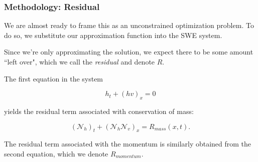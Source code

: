 \begin{frame}
    \frametitle{Methodology: Residual}

    We are almost ready to frame this as an unconstrained optimization problem. To do so, we substitute our approximation 
    function into the SWE system. 

    \bigskip
    \pause

    Since we're only approximating the solution, we expect there to be some amount ``left over", which we call the 
    \textit{residual} and denote $R$. 
    
    \bigskip
    \pause

    The first equation in the system 
    
    $$
    h_t + (hv)_x = 0
    $$
    
    yields the residual term associated with conservation of mass:

    $$
    \left( \mathcal{N}_h \right)_t + \left( \mathcal{N}_h \mathcal{N}_v \right)_x = R_{mass}(x, t).
    $$

    \bigskip
    \pause

    The residual term associated with the momentum is similarly obtained from the second equation, which we denote 
    $R_{momentum}$.
\end{frame}
